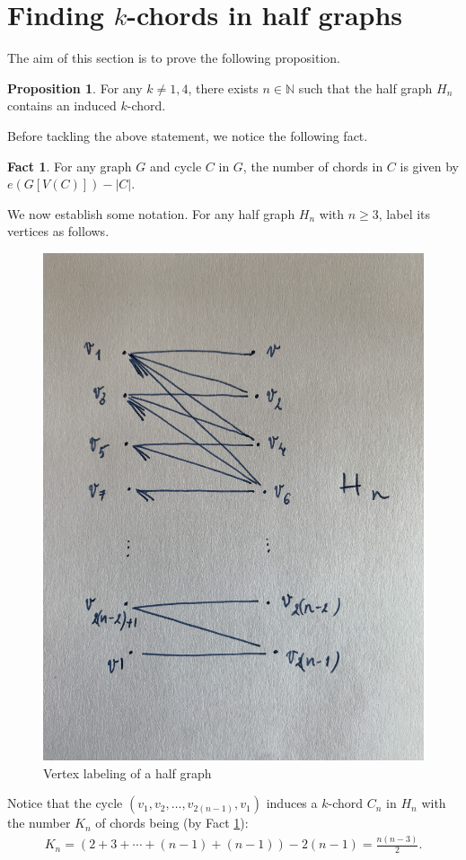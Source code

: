 \documentclass[12pt]{article}
\theoremstyle{definition}
\newtheorem{prop}[thm]{Proposition}
\newtheorem{fact}[thm]{Fact}
\begin{document}
    \section{Finding \texorpdfstring{$k$}{k}-chords in half graphs}
    
    The aim of this section 
    is to prove the following 
    proposition.

    \begin{prop} \label{prop:hg}
        For any $k \neq 1, 4$,
        there exists $n \in \mathbb{N}$
        such that the half
        graph $H_{n}$ 
        contains an induced 
        $k$-chord.
    \end{prop}

    Before tackling the
    above statement, we notice the
    following fact.
    
    \begin{fact} \label{fact:edges}
        For any graph $G$
        and cycle $C$ in $G$, 
        the number of chords in $C$ 
        is given by $e\left(G\left[V\left(C\right)\right]\right)
        - \left|C\right|$.
    \end{fact}
    
    We now establish 
    some notation. For
    any half graph $H_{n}$ 
    with $n \geq 3$, label
    its vertices as follows.
    \begin{figure}[h]
        \centering
        \includegraphics[width=0.35\linewidth, angle=270]{Figure_k-chord.jpg}
        \caption{Vertex labeling of a half graph}
        \label{fig:hg}
    \end{figure}

    Notice that the cycle
    $\left(v_1, v_2, \ldots,
    v_{2\left(n-1\right)}, v_1\right)$ 
    induces a $k$-chord
    $C_{n}$ in $H_{n}$
    with the number $K_{n}$ 
    of chords being (by Fact \ref{fact:edges}):
    \begin{gather*}
        K_{n} = \left(
        2 + 3 + \cdots + \left(n-1\right)
        + \left(n-1\right)\right)
        -2\left(n-1\right) =
        \frac{n\left(n-3\right)}{2}.
    \end{gather*}
    
\end{document}
